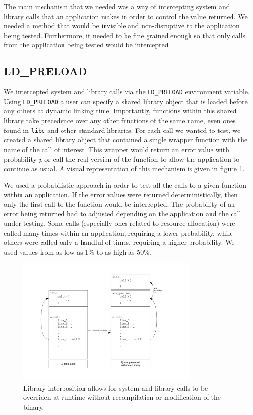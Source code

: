 The main mechanism that we needed was a way of intercepting system and library calls that an application makes in order to control the value returned. We needed a method that would be invisible and non-disruptive to the application being tested. Furthermore, it needed to be fine grained enough so that only calls from the  application being tested would be intercepted.

\subsection{LD\_PRELOAD} \label{ld_preload}
We intercepted system and library calls via the \texttt{LD\_PRELOAD} environment variable. Using \texttt{LD\_PRELOAD} a user can specify a shared library object that is loaded before any others at dynamic linking time. Importantly, functions within this shared library take precedence over any other functions of the same name, even ones found in \texttt{libc} and other standard libraries. For each call we wanted to test, we created a shared library object that contained a single wrapper function with the name of the call of interest. This wrapper would return an error value with probability $p$ or call the real version of the function to allow the application to continue as usual. A visual representation of this mechanism is given in figure \ref{fig:ld_preload}.

We used a probabilistic approach in order to test all the calls to a given function within an application. If the error values were returned deterministically, then only the first call to the function would be intercepted. The probability of an error being returned had to adjusted depending on the application and the call under testing. Some calls (especially ones related to resource allocation) were called many times within an application, requiring a lower probability, while others were called only a handful of times, requiring a higher probability. We used values from as low as 1\% to as high as 50\%.

\begin{figure}
  \centering
	\includegraphics[width=0.8\textwidth]{ldpreload_fig}
	\caption{Library interposition allows for system and library calls to be overriden at runtime without recompilation or modification of the binary.}
  \label{fig:ld_preload}
\end{figure}

